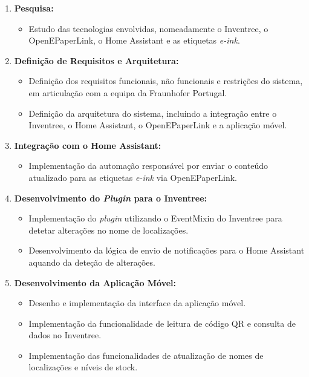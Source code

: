 \documentclass[10pt]{article}
\begin{document}
\begin{enumerate}
    \item \textbf{Pesquisa:}
    \begin{itemize}
        \item Estudo das tecnologias envolvidas, nomeadamente o Inventree, 
        o OpenEPaperLink, o Home Assistant e as etiquetas \textit{e-ink}.
    \end{itemize}

    \item \textbf{Definição de Requisitos e Arquitetura:}
    \begin{itemize}
        \item Definição dos requisitos funcionais, não funcionais e restrições 
        do sistema, em articulação com a equipa da Fraunhofer Portugal.
        \item Definição da arquitetura do sistema, incluindo a integração 
        entre o Inventree, o Home Assistant, o OpenEPaperLink e a aplicação 
        móvel.
    \end{itemize}

    \item \textbf{Integração com o Home Assistant:}
    \begin{itemize}
        \item Implementação da automação responsável por enviar o conteúdo 
        atualizado para as etiquetas \textit{e-ink} via OpenEPaperLink.
    \end{itemize}

    \item \textbf{Desenvolvimento do \textit{Plugin} para o Inventree:}
    \begin{itemize}
        \item Implementação do \textit{plugin} utilizando o EventMixin do 
        Inventree para detetar alterações no nome de localizações.
        \item Desenvolvimento da lógica de envio de notificações para o 
        Home Assistant aquando da deteção de alterações.
    \end{itemize}

    \item \textbf{Desenvolvimento da Aplicação Móvel:}
    \begin{itemize}
        \item Desenho e implementação da interface da aplicação móvel.
        \item Implementação da funcionalidade de leitura de código QR e 
        consulta de dados no Inventree.
        \item Implementação das funcionalidades de atualização de nomes 
        de localizações e níveis de stock.
    \end{itemize}


\end{enumerate}
\end{document}
